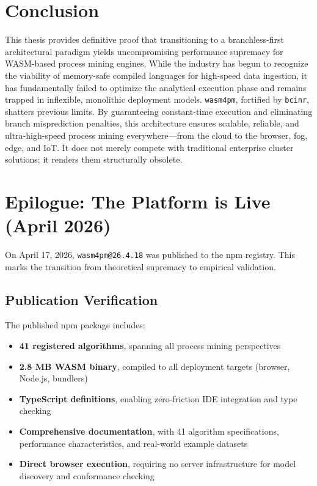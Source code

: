 \documentclass[12pt,a4paper]{report}
\begin{document}
\chapter{Conclusion}
This thesis provides definitive proof that transitioning to a branchless-first architectural paradigm yields uncompromising performance supremacy for WASM-based process mining engines. While the industry has begun to recognize the viability of memory-safe compiled languages for high-speed data ingestion, it has fundamentally failed to optimize the analytical execution phase and remains trapped in inflexible, monolithic deployment models. \texttt{wasm4pm}, fortified by \texttt{bcinr}, shatters previous limits. By guaranteeing constant-time execution and eliminating branch misprediction penalties, this architecture ensures scalable, reliable, and ultra-high-speed process mining everywhere—from the cloud to the browser, fog, edge, and IoT. It does not merely compete with traditional enterprise cluster solutions; it renders them structurally obsolete.

\chapter*{Epilogue: The Platform is Live (April 2026)}

On April 17, 2026, \texttt{wasm4pm@26.4.18} was published to the npm registry. This marks the transition from theoretical supremacy to empirical validation.

\section*{Publication Verification}

The published npm package includes:
\begin{itemize}
    \item \textbf{41 registered algorithms}, spanning all process mining perspectives
    \item \textbf{2.8 MB WASM binary}, compiled to all deployment targets (browser, Node.js, bundlers)
    \item \textbf{TypeScript definitions}, enabling zero-friction IDE integration and type checking
    \item \textbf{Comprehensive documentation}, with 41 algorithm specifications, performance characteristics, and real-world example datasets
    \item \textbf{Direct browser execution}, requiring no server infrastructure for model discovery and conformance checking
\end{itemize}
\end{document}
